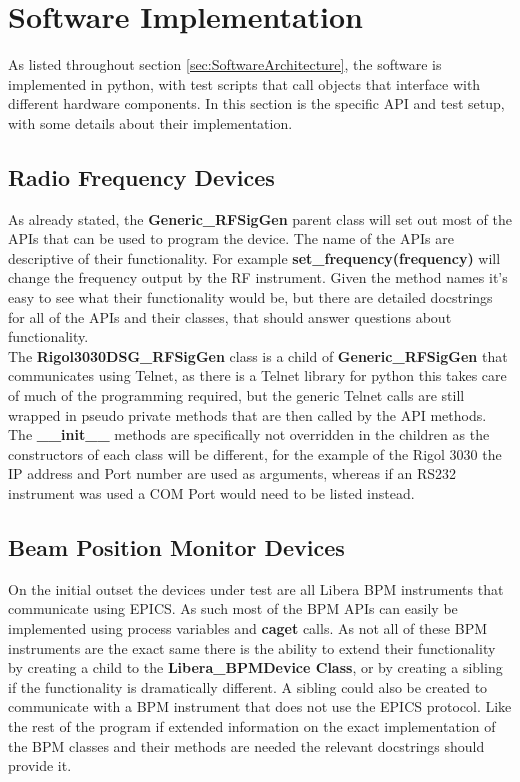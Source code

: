 \documentclass[a4paper, 11pt]{article}
\begin{document}
\section{Software Implementation}
As listed throughout section \ref{sec:SoftwareArchitecture}, the software is implemented in python, with test scripts that call objects that interface with different hardware components. In this section is the specific API and test setup, with some details about their implementation. 

\subsection{Radio Frequency Devices}
As already stated, the \textbf{Generic\_RFSigGen} parent class will set out most of the APIs that can be used to program the device. The name of the APIs are descriptive of their functionality. For example \textbf{set\_frequency(frequency)} will change the frequency output by the RF instrument. Given the method names it's easy to see what their functionality would be, but there are detailed docstrings for all of the APIs and their classes, that should answer questions about functionality. \\
The \textbf{Rigol3030DSG\_RFSigGen} class is a child of \textbf{Generic\_RFSigGen} that communicates using Telnet, as there is a Telnet library for python this takes care of much of the programming required, but the generic Telnet calls are still wrapped in pseudo private methods that are then called by the API methods. The \textbf{\_\_init\_\_} methods are specifically not overridden in the children as the constructors of each class will be different, for the example of the Rigol 3030 the IP address and Port number are used as arguments, whereas if an RS232 instrument was used a COM Port would need to be listed instead. 

\subsection{Beam Position Monitor Devices}
On the initial outset the devices under test are all Libera BPM instruments that communicate using EPICS. As such most of the BPM APIs can easily be implemented using process variables and \textbf{caget} calls. As not all of these BPM instruments are the exact same there is the ability to extend their functionality by creating a child to the \textbf{Libera\_BPMDevice Class}, or by creating a sibling if the functionality is dramatically different. A sibling could also be created to communicate with a BPM instrument that does not use the EPICS protocol. Like the rest of the program if extended information on the exact implementation of the BPM classes and their methods are needed the relevant docstrings should provide it. 
\end{document}
